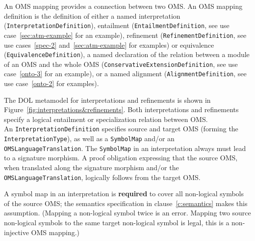 \documentclass[10pt, a4paper]{isov2}
\newcommand*{\termref}[1]{\index{#1}#1\xspace}
\newcommand*{\syntax}[1]{\texttt{#1}}
\newcommand*{\required}{\textbf{required}\xspace}
\renewcommand{\clauserefname}{clause}
\renewcommand{\cref}[1]{\clauserefname~\ref{#1}}
\begin{document}
\label{c:oms-mappings}




An OMS mapping provides a connection between two OMS. An OMS mapping
definition is the definition of either a named interpretation
(\syntax{Interpretation\-Definition}), entailment (\syntax{EntailmentDef\-i\-nition}, see use case~\ref{sec:atm-example} for an example),
refinement (\syntax{RefinementDef\-i\-nition}, see use cases~\ref{spec-2} and~\ref{sec:atm-example} for examples) or equivalence
(\syntax{Equiva\-lenceDef\-i\-nition}), a named declaration of the relation
between a module of an OMS and the whole OMS
(\syntax{ConservativeEx\-ten\-sion\-Definition}, see use case~\ref{onto-3} for an example), or a named \termref{alignment}
(\syntax{Align\-mentDefinition}, see use case~\ref{onto-2} for examples).


The DOL metamodel for  interpretations and refinements is shown in
Figure~\ref{fig:interpretations&refinements}.
Both interpretations and refinements specify a logical entailment or
specialization relation between OMS.\\
 An
\syntax{InterpretationDefinition} specifies source and target OMS
(forming the \syntax{InterpretationType}), as well as a
\syntax{SymbolMap} and/or an \syntax{OMSLan\-guage\-Translation}.  The
\syntax{SymbolMap} in an interpretation always must lead to a
signature morphism. A proof obligation expressing that the source OMS,
when translated along the signature morphism and/or the
\syntax{OMSLanguageTrans\-lation}, logically follows from the target OMS.

A symbol map in an interpretation is \required to cover all
non-logical symbols of the source OMS; the semantics specification in
\cref{c:semantics} makes this assumption. ({Mapping a non-logical
  symbol twice is an error. Mapping two source non-logical symbols to
  the same target non-logical symbol is legal, this is a non-injective
  OMS mapping.})
\end{document}
